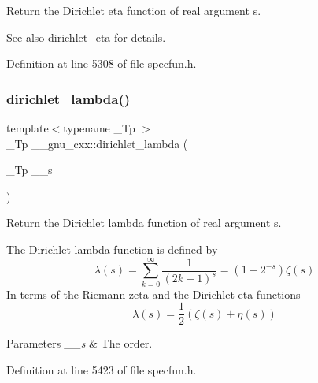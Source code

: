Return the Dirichlet eta function of real argument {\ttfamily s}.

\begin{DoxySeeAlso}{See also}
\hyperlink{group__mathsf__gnu_gae46e26e4107675d285c79a2d6202e6c7}{dirichlet\+\_\+eta} for details. 
\end{DoxySeeAlso}


Definition at line 5308 of file specfun.\+h.

\mbox{\label{group__mathsf__gnu_ga06842a81bdcabf9c62252dde992d42ee}} 
\subsubsection{\texorpdfstring{dirichlet\+\_\+lambda()}{dirichlet\_lambda()}}
{\footnotesize\ttfamily template$<$typename \+\_\+\+Tp $>$ \\
\+\_\+\+Tp \+\_\+\+\_\+gnu\+\_\+cxx\+::dirichlet\+\_\+lambda (\begin{DoxyParamCaption}\item[{\+\_\+\+Tp}]{\+\_\+\+\_\+s }\end{DoxyParamCaption})\hspace{0.3cm}{\ttfamily [inline]}}

Return the Dirichlet lambda function of real argument {\ttfamily s}.

The Dirichlet lambda function is defined by \[ \lambda(s) = \sum_{k=0}^\infty \frac{1}{(2k+1)^s} = \left( 1 - 2^{-s} \right) \zeta(s) \] In terms of the Riemann zeta and the Dirichlet eta functions \[ \lambda(s) = \frac{1}{2}(\zeta(s) + \eta(s)) \]


\begin{DoxyParams}{Parameters}
{\em \+\_\+\+\_\+s} & The order. \\
\hline
\end{DoxyParams}


Definition at line 5423 of file specfun.\+h.

\mbox{\label{group__mathsf__gnu_gaafd3ca6b0d71d55d3835536396eece8f}} 
